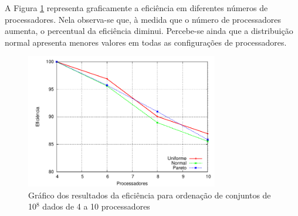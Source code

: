A Figura \ref{fig:MaquinasEficiencia} representa graficamente a eficiência em diferentes números de processadores. Nela observa-se que, à medida que o número de processadores aumenta, o percentual da eficiência diminui. Percebe-se ainda que a distribuição normal apresenta menores valores em todas as configurações de processadores.

\begin{figure}[htb]
\centering
\includegraphics[width=0.75\textwidth]{figuras/MaquinasEficiencia.pdf}
\caption{Gráfico dos resultados da eficiência para ordenação de conjuntos de 10$^8$ dados de 4 a 10 processadores}
\label{fig:MaquinasEficiencia}
\end{figure}

